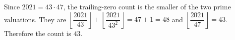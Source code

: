 Since $2021=43\cdot47$, the trailing-zero count is the smaller of the two prime valuations. They are $\left\lfloor\dfrac{2021}{43}\right\rfloor+\left\lfloor\dfrac{2021}{43^2}\right\rfloor=47+1=48$ and $\left\lfloor\dfrac{2021}{47}\right\rfloor=43$. Therefore the count is $\boxed{43}$.
